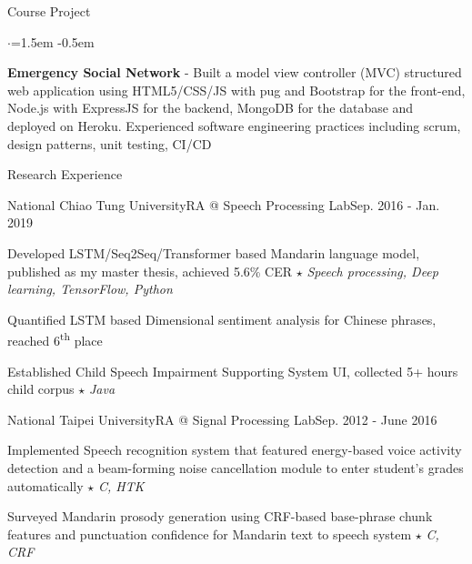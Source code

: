 \documentclass{resume_short} %
\newcommand{\ts}{\textsuperscript}
\begin{document}
\begin{rSection}{Course Project}
    \begin{list}{$\cdot$}{\leftmargin=1.5em}
        \itemsep -0.5em \vspace{-0.25em} %
        \item {\bf Emergency Social Network} - Built a model view controller (MVC) structured web application using HTML5/CSS/JS with pug and Bootstrap for the front-end, Node.js with ExpressJS for the backend, MongoDB for the database and deployed on Heroku. 
        Experienced software engineering practices including scrum, design patterns, unit testing, CI/CD
    \end{list}
\end{rSection}

\begin{rSection}{Research Experience}
    \begin{rSubsection3}{National Chiao Tung University}{RA @ Speech Processing Lab}{Sep. 2016 - Jan. 2019}
        \item Developed LSTM/Seq2Seq/Transformer based Mandarin language model, published as my master thesis, achieved 5.6\% CER \quad$\star$ {\em Speech processing, Deep learning, TensorFlow, Python}
        \item Quantified LSTM based Dimensional sentiment analysis for Chinese phrases, reached 6\ts{th} place %
        \item Established Child Speech Impairment Supporting System UI, collected 5+ hours child corpus \quad $\star$ {\em Java}
    \end{rSubsection3}
    \begin{rSubsection3}{National Taipei University}{RA @ Signal Processing Lab}{Sep. 2012 - June 2016}
        \item Implemented Speech recognition system that featured energy-based voice activity detection and a beam-forming noise cancellation module to enter student’s grades automatically \quad$\star$ {\em C, HTK}
        \item Surveyed Mandarin prosody generation using CRF-based base-phrase chunk features and punctuation confidence for Mandarin text to speech system \quad$\star$ {\em C, CRF}
    \end{rSubsection3}
\end{rSection}
\end{document}
